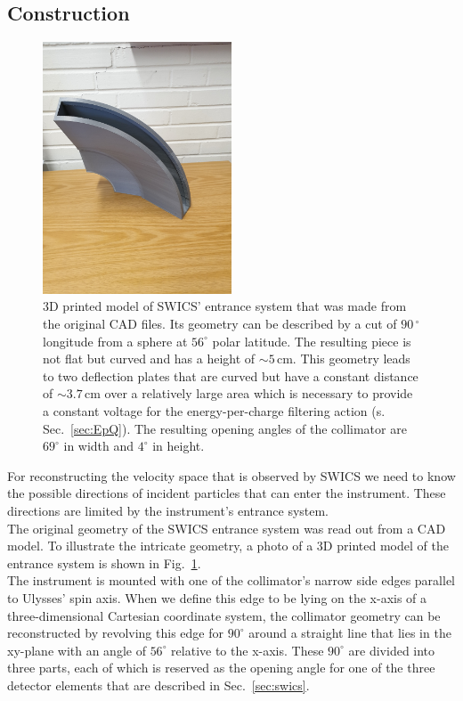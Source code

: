 \subsection{Construction} 
\label{subsec:construction}
\begin{figure}[h]
	\includegraphics[width=0.5\textwidth]{Figures/photo_swics2.jpg}
	\centering
	\caption{3D printed model of SWICS' entrance system that was made from the original CAD files. Its geometry can be described by a cut of $90\,^\circ$ longitude from a sphere at $56 ^\circ$ polar latitude. The resulting piece is not flat but curved and has a height of $\sim 5\,\mathrm{cm}$. This geometry leads to two deflection plates that are curved but have a constant distance of $\sim 3.7\,\mathrm{cm}$ over a relatively large area which is necessary to provide a constant voltage for the energy-per-charge filtering action (s. Sec.~\ref{sec:EpQ}). The resulting opening angles of the collimator are $69^\circ$ in width and $4^\circ$ in height.}
	\label{fig:3dcol}
\end{figure}
For reconstructing the velocity space that is observed by SWICS we need to know the possible directions of incident particles that can enter the instrument. These directions are limited by the instrument's entrance system.
\\
The original geometry of the SWICS entrance system was read out from a CAD model. To illustrate the intricate geometry, a photo of a 3D printed model of the entrance system is shown in Fig.~\ref{fig:3dcol}.\\
The instrument is mounted with one of the collimator's narrow side edges parallel to Ulysses' spin axis. When we define this edge to be lying on the x-axis of a three-dimensional Cartesian coordinate system, the collimator geometry can be reconstructed by revolving this edge for $90^\circ$ around a straight line that lies in the xy-plane with an angle of $56^\circ$ relative to the x-axis.  These $90^\circ$ are divided into three parts, each of which is reserved as the opening angle for one of the three detector elements that are described in Sec.~\ref{sec:swics}. \\ \\

